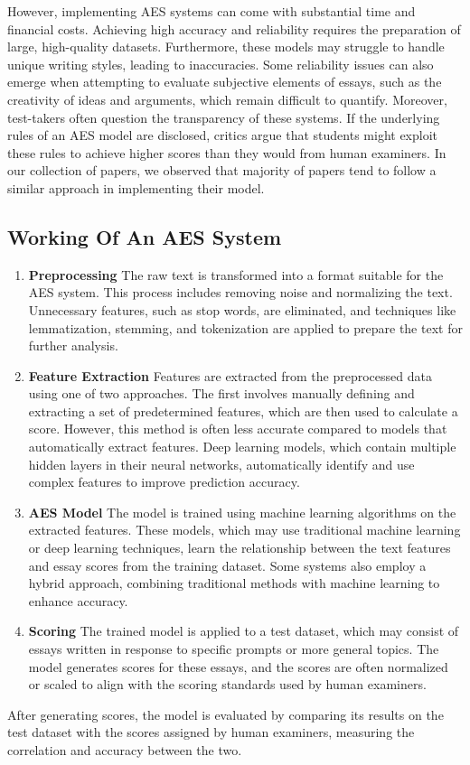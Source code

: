 \documentclass{article}
\begin{document}
	However, implementing AES systems can come with substantial time and financial costs. Achieving high accuracy and reliability requires the preparation of large, high-quality datasets. Furthermore, these models may struggle to handle unique writing styles, leading to inaccuracies. Some reliability issues can also emerge when attempting to evaluate subjective elements of essays, such as the creativity of ideas and arguments, which remain difficult to quantify. Moreover, test-takers often question the transparency of these systems. If the underlying rules of an AES model are disclosed, critics argue that students might exploit these rules to achieve higher scores than they would from human examiners.
	In our collection of papers, we observed that majority of papers tend to follow a similar approach in implementing their model.
	\subsection{Working Of An AES System}
	\begin{enumerate}
		\item \textbf{Preprocessing} The raw text is transformed into a format suitable for the AES system. This process includes removing noise and normalizing the text. Unnecessary features, such as stop words, are eliminated, and techniques like lemmatization, stemming, and tokenization are applied to prepare the text for further analysis.
		
		\item \textbf{Feature Extraction} Features are extracted from the preprocessed data using one of two approaches. The first involves manually defining and extracting a set of predetermined features, which are then used to calculate a score. However, this method is often less accurate compared to models that automatically extract features. Deep learning models, which contain multiple hidden layers in their neural networks, automatically identify and use complex features to improve prediction accuracy.
		
		\item \textbf{AES Model} The model is trained using machine learning algorithms on the extracted features. These models, which may use traditional machine learning or deep learning techniques, learn the relationship between the text features and essay scores from the training dataset. Some systems also employ a hybrid approach, combining traditional methods with machine learning to enhance accuracy.
		
		\item \textbf{Scoring} The trained model is applied to a test dataset, which may consist of essays written in response to specific prompts or more general topics. The model generates scores for these essays, and the scores are often normalized or scaled to align with the scoring standards used by human examiners.
	\end{enumerate}
	After generating scores, the model is evaluated by comparing its results on the test dataset with the scores assigned by human examiners, measuring the correlation and accuracy between the two.
\end{document}
